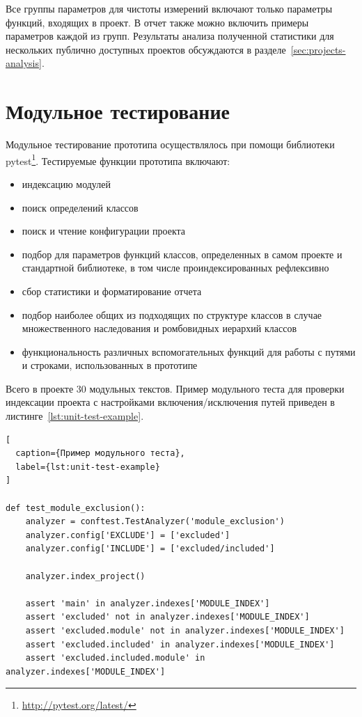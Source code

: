 Все группы параметров для чистоты измерений включают только параметры функций,
входящих в проект. В отчет также можно включить примеры параметров каждой из групп.
Результаты анализа полученной статистики для нескольких публично доступных
проектов обсуждаются в разделе~\ref{sec:projects-analysis}.

\section{Модульное тестирование}
\label{sec:unit-testing}

Модульное тестирование прототипа осуществлялось при помощи библиотеки
pytest\footnote{\url{http://pytest.org/latest/}}. Тестируемые функции прототипа
включают:

\begin{itemize}
    \item индексацию модулей
    \item поиск определений классов
    \item поиск и чтение конфигурации проекта
    \item подбор для параметров функций классов, определенных в самом проекте и
      стандартной библиотеке, в том числе проиндексированных рефлексивно
    \item сбор статистики и форматирование отчета
    \item подбор наиболее общих из подходящих по структуре классов в случае
      множественного наследования и ромбовидных иерархий классов
    \item функциональность различных вспомогательных функций для работы с
      путями и строками, использованных в прототипе
\end{itemize}

Всего в проекте 30 модульных текстов. Пример модульного теста для проверки
индексации проекта с настройками включения/исключения путей приведен в
листинге~\ref{lst:unit-test-example}.

\begin{lstlisting}[
  caption={Пример модульного теста},
  label={lst:unit-test-example}
]

def test_module_exclusion():
    analyzer = conftest.TestAnalyzer('module_exclusion')
    analyzer.config['EXCLUDE'] = ['excluded']
    analyzer.config['INCLUDE'] = ['excluded/included']

    analyzer.index_project()

    assert 'main' in analyzer.indexes['MODULE_INDEX']
    assert 'excluded' not in analyzer.indexes['MODULE_INDEX']
    assert 'excluded.module' not in analyzer.indexes['MODULE_INDEX']
    assert 'excluded.included' in analyzer.indexes['MODULE_INDEX']
    assert 'excluded.included.module' in analyzer.indexes['MODULE_INDEX']

\end{lstlisting}
